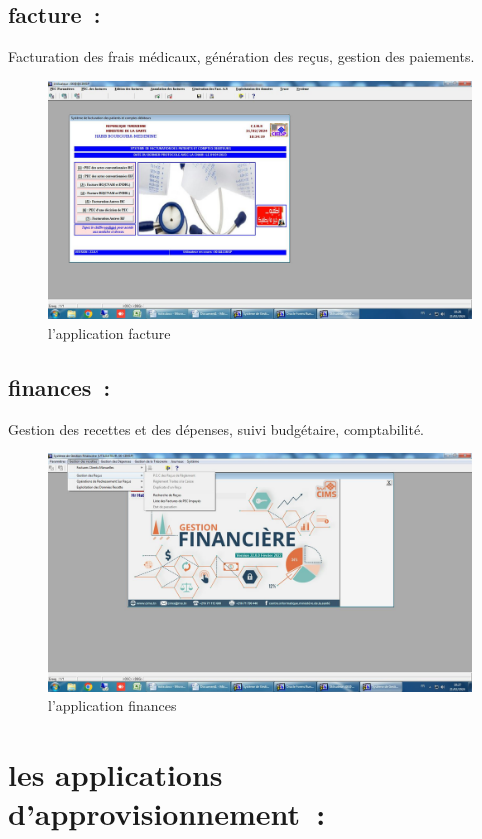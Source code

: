 \documentclass[12pt]{rapportINPTCLOUD}
\begin{document}
\subsection{facture :}  Facturation des frais médicaux, génération des reçus, gestion des paiements.
\begin{figure}[H]
\centering
\includegraphics[width=1\linewidth]{img/c.jpg}
\caption{l'application facture}
\label{fig:facture}
\end{figure}

\subsection{finances :} Gestion des recettes et des dépenses, suivi budgétaire, comptabilité.
\begin{figure}[H]
\centering
\includegraphics[width=1\linewidth]{img/d.jpg}
\caption{l'application finances}
\label{fig:finances}
\end{figure}
\newpage
	\section{\textcolor{sectioncolor}{les applications d’approvisionnement :}}
\end{document}
